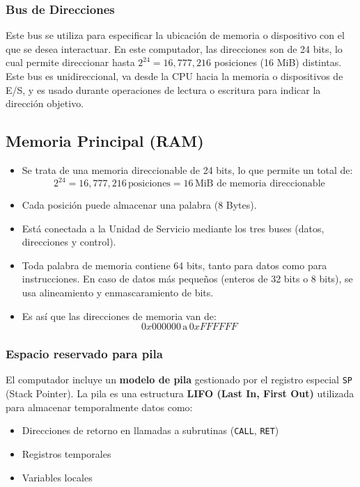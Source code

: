 \documentclass{article}
\begin{document}
\subsubsection*{Bus de Direcciones}

Este bus se utiliza para especificar la ubicación de memoria o
dispositivo con el que se desea interactuar. En este computador, las
direcciones son de 24 bits, lo cual permite direccionar hasta
$2^{24} = 16,\!777,\!216$ posiciones (16 MiB) distintas.
Este bus es unidireccional, va desde la CPU hacia la memoria o
dispositivos de E/S, y es usado durante operaciones de lectura o
escritura para indicar la dirección objetivo.

\subsection{Memoria Principal (RAM)}

\begin{itemize}
  \item Se trata de una memoria direccionable de 24 bits, lo que permite un total de:
        \[
          2^{24} = 16,777,216 \, \text{posiciones} = 16 \, \text{MiB de memoria direccionable}
        \]
  \item Cada posición puede almacenar una palabra (8 Bytes).
  \item Está conectada a la Unidad de Servicio mediante los tres buses (datos, direcciones y control).
  \item Toda palabra de memoria contiene 64 bits, tanto para datos como para instrucciones. En caso de datos más pequeños (enteros de 32 bits o 8 bits), se usa alineamiento y enmascaramiento de bits.
  \item Es así que las direcciones de memoria van de:
        \[
          0x000000 \, \text{a} \, 0xFFFFFF
        \]
\end{itemize}

\subsubsection{Espacio reservado para pila}

El computador incluye un \textbf{modelo de pila} gestionado por el registro especial \texttt{SP} (Stack Pointer). La pila es una estructura \textbf{LIFO (Last In, First Out)} utilizada para almacenar temporalmente datos como:

\begin{itemize}
  \item Direcciones de retorno en llamadas a subrutinas (\texttt{CALL}, \texttt{RET})
  \item Registros temporales
  \item Variables locales
\end{itemize}
\end{document}
